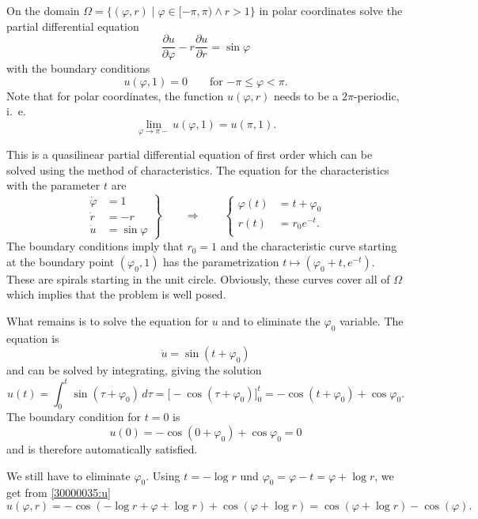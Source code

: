 On the domain
$\Omega=\{ (\varphi,r) \mid \varphi\in [-\pi,\pi)\wedge r>1\}$
in polar coordinates solve the partial differential equation
\[
\frac{\partial u}{\partial \varphi}
-
r
\frac{\partial u}{\partial r}
=
\sin\varphi
\]
with the boundary conditions
\[
u(\varphi,1) = 0
\qquad\text{for $-\pi \le \varphi < \pi$.}
\]
Note that for polar coordinates, the function $u(\varphi,r)$ needs to
be a $2\pi$-periodic, i.~e.
\[
\lim_{\varphi\to \pi-} u(\varphi,1) = u(\pi,1).
\]

\begin{loesung}
\begin{figure}
\centering
{}
\end{figure}
This is a quasilinear partial differential equation of first order
which can be solved using the method of characteristics.
The equation for the characteristics with the parameter $t$ are
\begin{equation*}
\left.
\begin{aligned}
\dot{\varphi} &=  1\\
\dot{r}       &= -r\\
\dot{u}       &=  \sin\varphi
\end{aligned}
\right\}
\qquad\Rightarrow\qquad
\left\{
\begin{aligned}
\varphi(t) &= t + \varphi_0 \\
r(t)       &= r_0e^{-t}.     \\
\end{aligned}
\right.
\end{equation*}
The boundary conditions imply that $r_0=1$ and the characteristic
curve starting at the boundary point $(\varphi_0,1)$ has the parametrization
$t \mapsto (\varphi_0+t,e^{-t})$.
These are spirals starting in the unit circle.
Obviously, these curves cover all of $\Omega$ which implies that the
problem is well posed.

What remains is to solve the equation for $u$ and to eliminate the
$\varphi_0$ variable.
The equation is
\[
\dot{u} = \sin(t+\varphi_0)
\]
and can be solved by integrating, giving the solution
\begin{equation}
u(t)
=
\int_0^t \sin(\tau+\varphi_0)\,d\tau
=
\biggl[-\cos(\tau+\varphi_0)\biggr]_0^t
=
-\cos(t+\varphi_0) + \cos\varphi_0.
\label{30000035:u}
\end{equation}
The boundary condition for $t=0$ is
\[
u(0)
=
-\cos(0+\varphi_0) +\cos \varphi_0
=
0
\]
and is therefore automatically satisfied.

We still have to eliminate $\varphi_0$.
Using $t=-\log r$ und $\varphi_0 = \varphi - t = \varphi+\log r$, we get
from
\eqref{30000035:u}
\[
u(\varphi, r)
=
-\cos(-\log r+\varphi+\log r) + \cos(\varphi+\log r)
=
\cos(\varphi+\log r)
-
\cos(\varphi).
\]


\end{loesung}
